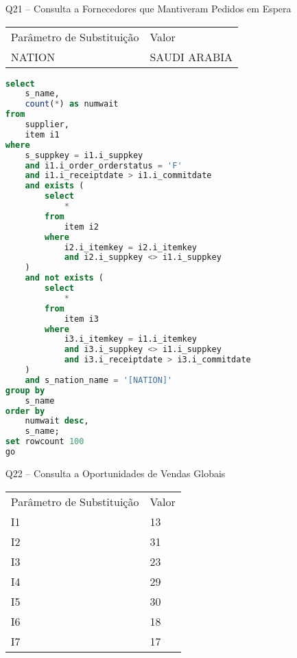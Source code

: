 \begin{enumerate}
\begin{lstlisting}[language=SQL]
\end{lstlisting}

\item[Q21 --] Consulta a Fornecedores que Mantiveram Pedidos em Espera

\begin{tabular}{ll}
	Parâmetro de Substituição & Valor\\
	NATION & SAUDI ARABIA\\
\end{tabular}

	\begin{lstlisting}[language=SQL]
select
    s_name,
    count(*) as numwait
from
    supplier,
    item i1
where
    s_suppkey = i1.i_suppkey
    and i1.i_order_orderstatus = 'F'
    and i1.i_receiptdate > i1.i_commitdate
    and exists (
        select
            *
        from
            item i2
        where
            i2.i_itemkey = i2.i_itemkey
            and i2.i_suppkey <> i1.i_suppkey
    )
    and not exists (
        select
            *
        from
            item i3
        where
            i3.i_itemkey = i1.i_itemkey
            and i3.i_suppkey <> i1.i_suppkey
            and i3.i_receiptdate > i3.i_commitdate
    )
    and s_nation_name = '[NATION]'
group by
    s_name
order by
    numwait desc,
    s_name;
set rowcount 100
go
	\end{lstlisting}

\item[Q22 --] Consulta a Oportunidades de Vendas Globais

\begin{tabular}{ll}
	Parâmetro de Substituição & Valor\\
	I1 & 13 \\
	I2 & 31 \\
	I3 & 23 \\
	I4 & 29 \\
	I5 & 30 \\
	I6 & 18 \\
	I7 & 17 \\
\end{tabular}


\end{enumerate}
